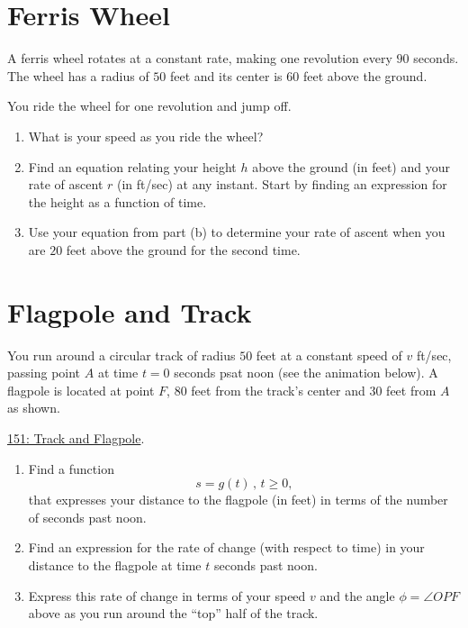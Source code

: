 \documentclass{ximera}
\begin{document}
\section{Ferris Wheel}
\begin{question}  \label{QOERERERERQ}
A ferris wheel rotates at a constant rate, making one revolution every $90$ seconds. The wheel has a radius of $50$ feet and its center is $60$ feet above the ground.

You ride the wheel for one revolution and jump off.

\begin{enumerate}
\item What is your speed as you ride the wheel?

\item Find an equation relating your height $h$ above the ground (in feet) and your rate of ascent $r$ (in ft/sec) at any instant. Start by finding an expression for the height as a function of time. 

\item Use your equation from part (b) to determine your rate of ascent when you are $20$ feet above the ground for the second time.
\end{enumerate}
\end{question}

\section{Flagpole and Track}


\begin{question} \label{QPEErmE}

You run around a circular track of radius $50$ feet at a constant speed of $v$ ft/sec, passing point $A$ at time $t=0$ seconds psat noon (see the animation below). A flagpole is located at point $F$, $80$ feet from the track's center and $30$ feet from $A$ as shown.


\href{https://www.desmos.com/calculator/xymelsnabl}{151: Track and Flagpole}.

 
\begin{onlineOnly}
    \begin{center}
\end{center}
\end{onlineOnly}

\begin{enumerate}
\item Find a function
\[
  s =g(t) \, , \, t\geq 0 ,
\]
that expresses your distance to the flagpole (in feet) in terms of the number of seconds past noon.

\item Find an expression for the rate of change (with respect to time) in your distance to the flagpole at time $t$ seconds past noon.

\item Express this rate of change in terms of your speed $v$ and the angle $\phi = \angle OPF$ above as you run around the ``top'' half of the track.


\end{enumerate}

\end{question}
\end{document}
